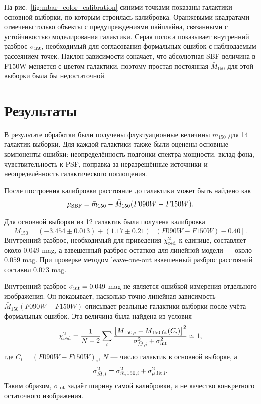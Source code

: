 \documentclass[12pt,a4paper]{article}
\begin{document}
На рис.~\ref{fig:mbar_color_calibration} синими точками показаны галактики основной выборки, по которым строилась калибровка. Оранжевыми квадратами отмечены только объекты с предупреждениями пайплайна, связанными с устойчивостью моделирования галактики. Серая полоса показывает внутренний разброс $\sigma_{\rm int}$, необходимый для согласования формальных ошибок с наблюдаемым рассеянием точек. Наклон зависимости означает, что абсолютная SBF-величина в F150W меняется с цветом галактики, поэтому простая постоянная $\bar{M}_{150}$ для этой выборки была бы недостаточной.

\section{Результаты}

В результате обработки были получены флуктуационные величины $\bar{m}_{150}$ для 14 галактик выборки. Для каждой галактики также были оценены основные компоненты ошибки: неопределённость подгонки спектра мощности, вклад фона, чувствительность к PSF, поправка за неразрешённые источники и неопределённость галактического поглощения.

После построения калибровки расстояние до галактики может быть найдено как
\begin{equation}
    \mu_{\rm SBF} = \bar{m}_{150} - \bar{M}_{150}(F090W-F150W).
\end{equation}

Для основной выборки из 12 галактик была получена калибровка
\begin{equation}
    \bar{M}_{150} =
    (-3.454 \pm 0.013) +
    (1.17 \pm 0.21)\left[(F090W-F150W)-0.40\right].
\end{equation}
Внутренний разброс, необходимый для приведения $\chi^2_{\rm red}$ к единице, составляет около $0.049$ mag, а взвешенный разброс остатков для линейной модели --- около $0.059$ mag. При проверке методом leave-one-out взвешенный разброс расстояний составил $0.073$ mag.

Внутренний разброс $\sigma_{\rm int}=0.049$ mag не является ошибкой измерения отдельного изображения. Он показывает, насколько точно линейная зависимость $\bar{M}_{150}(F090W-F150W)$ описывает реальные галактики выборки после учёта формальных ошибок. Эта величина была найдена из условия
\begin{equation}
    \chi^2_{\rm red} =
    \frac{1}{N-2}\sum_i
    \frac{\left[\bar{M}_{150,i} - \bar{M}_{150,\rm fit}(C_i)\right]^2}
    {\sigma_{\bar{M},i}^2 + \sigma_{\rm int}^2}
    \simeq 1,
\end{equation}
где $C_i=(F090W-F150W)_i$, $N$ --- число галактик в основной выборке, а
\begin{equation}
    \sigma_{\bar{M},i}^2 = \sigma_{\bar{m},150,i}^2 + \sigma_{\mu,\rm lit,i}^2.
\end{equation}
Таким образом, $\sigma_{\rm int}$ задаёт ширину самой калибровки, а не качество конкретного остаточного изображения.
\end{document}
